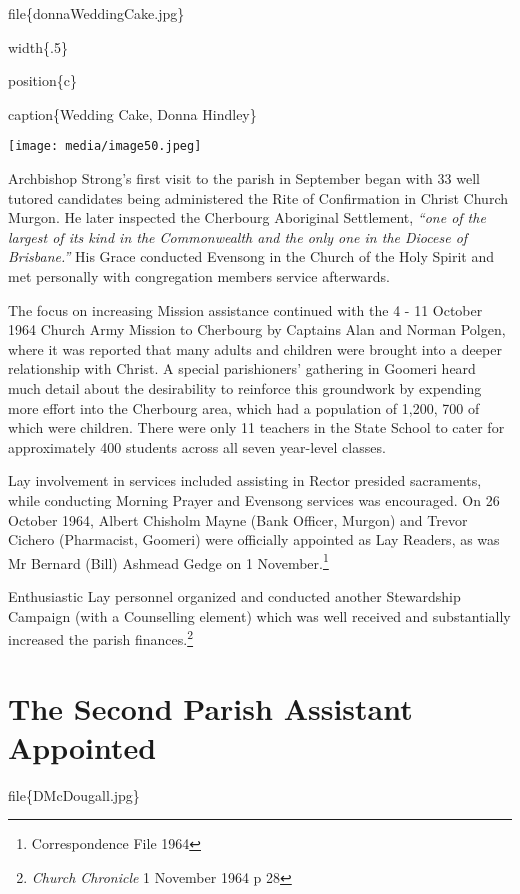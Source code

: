 file\{donnaWeddingCake.jpg\}

width\{.5\}

position\{c\}

caption\{Wedding Cake, Donna Hindley\}

\texttt{[image: media/image50.jpeg]}

Archbishop Strong's first visit to the parish in September began with 33 well tutored candidates being administered the Rite of Confirmation in Christ Church Murgon. He later inspected the Cherbourg Aboriginal Settlement, \emph{``one of the largest of its kind in the Commonwealth and the only one in the Diocese of Brisbane.''} His Grace conducted Evensong in the Church of the Holy Spirit and met personally with congregation members service afterwards.

The focus on increasing Mission assistance continued with the 4 - 11 October 1964 Church Army Mission to Cherbourg by Captains Alan and Norman Polgen, where it was reported that many adults and children were brought into a deeper relationship with Christ. A special parishioners' gathering in Goomeri heard much detail about the desirability to reinforce this groundwork by expending more effort into the Cherbourg area, which had a population of 1,200, 700 of which were children. There were only 11 teachers in the State School to cater for approximately 400 students across all seven year-level classes.

Lay involvement in services included assisting in Rector presided sacraments, while conducting Morning Prayer and Evensong services was encouraged. On 26 October 1964, Albert Chisholm Mayne (Bank Officer, Murgon) and Trevor Cichero (Pharmacist, Goomeri) were officially appointed as Lay Readers, as was Mr Bernard (Bill) Ashmead Gedge on 1 November.\footnote{Correspondence File 1964}

Enthusiastic Lay personnel organized and conducted another Stewardship Campaign (with a Counselling element) which was well received and substantially increased the parish finances.\footnote{\emph{Church Chronicle} 1 November 1964 p 28}

\hypertarget{the-second-parish-assistant-appointed}{%
\section{The Second Parish Assistant Appointed}\label{the-second-parish-assistant-appointed}}

file\{DMcDougall.jpg\}

